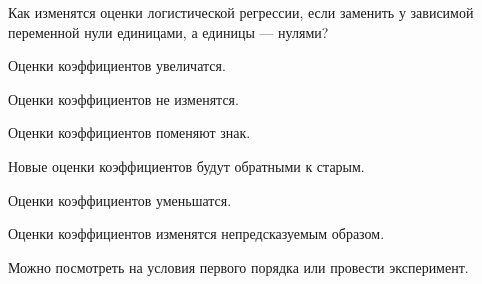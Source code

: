 
\begin{question}
Как изменятся оценки логистической регрессии,
если заменить у зависимой переменной нули единицами,
а единицы --- нулями?
\begin{answerlist}
  \item Оценки коэффициентов увеличатся.
  \item Оценки коэффициентов не изменятся.
  \item Оценки коэффициентов поменяют знак.
  \item Новые оценки коэффициентов будут обратными к старым.
  \item Оценки коэффициентов уменьшатся.
  \item Оценки коэффициентов изменятся непредсказуемым образом.
\end{answerlist}
\end{question}

\begin{solution}
Можно посмотреть на условия первого порядка или провести эксперимент.
\end{solution}


